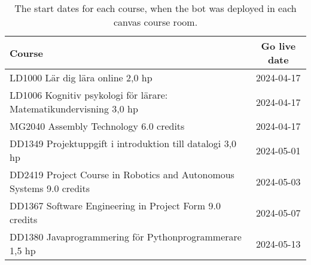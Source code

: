 \begin{table}[H]
\centering
{\scriptsize
\begin{tabularx}{\textwidth}{@{}X c@{}}
\toprule
\textbf{Course} & \textbf{Go live date} \\ \midrule
LD1000 Lär dig lära online 2,0 hp & 2024-04-17 \\
LD1006 Kognitiv psykologi för lärare: Matematikundervisning 3,0 hp & 2024-04-17 \\
MG2040 Assembly Technology 6.0 credits & 2024-04-17 \\
DD1349 Projektuppgift i introduktion till datalogi 3,0 hp & 2024-05-01 \\
DD2419 Project Course in Robotics and Autonomous Systems 9.0 credits & 2024-05-03 \\
DD1367 Software Engineering in Project Form 9.0 credits & 2024-05-07 \\
DD1380 Javaprogrammering för Pythonprogrammerare 1,5 hp & 2024-05-13 \\
\bottomrule
\end{tabularx}
}
\vspace{2mm}
\caption{The start dates for each course, when the bot was deployed in each canvas course room.}
\label{tab:course_start_dates}
\end{table}
